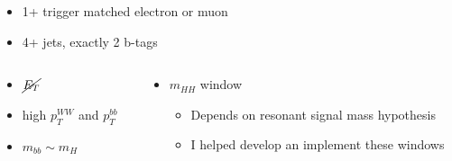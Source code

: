 \documentclass{beamer}
\newcommand*{\met}{\ensuremath{\cancel{E_{T}}}\xspace}
\newcommand*{\header}[1]{\fontsize{16}{8}\selectfont \textbf{{\color{MyPurple}{#1}}}}
\begin{document}
\begin{frame}
\begin{center}
\header{Resolved Event Selection}
\end{center}
\color{MyPurple}{Pre-selection}
\begin{itemize}
\item 1+ trigger matched electron or muon
\item 4+ jets, exactly 2 b-tags
\end{itemize}
\color{MyPurple}{Event Selection}\color{black}
\begin{columns}
\begin{column}{0.5\textwidth}
\begin{itemize}
\item $\met$
\item high $p_{T}^{WW}$ and $p_{T}^{bb}$
\item $m_{bb}\sim{}m_{H}$
\end{itemize}
\end{column}
\begin{column}{0.5\textwidth}
\begin{itemize}
\item $m_{HH}$ window
\begin{itemize}
\item Depends on resonant signal mass hypothesis
\item I helped develop an implement these windows 
\end{itemize}
\end{itemize}
\end{column}
\end{columns}
\end{frame}
\end{document}
